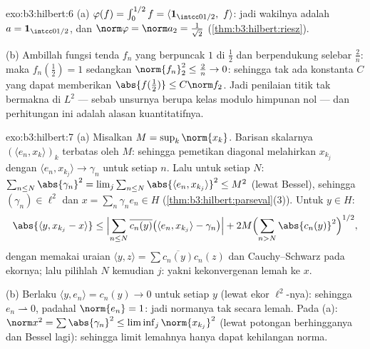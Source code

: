 \begin{solution}{exo:b3:hilbert:6}
(a) $\varphi(f) = \int_0^{1/2}f = \langle\mathbf
1_{\intcc0{1/2}},\ f\rangle$: jadi wakilnya adalah $a =
\mathbf 1_{\intcc0{1/2}}$, dan $\norm\varphi = \norm a_2 =
\frac1{\sqrt2}$ (\cref{thm:b3:hilbert:riesz}).

(b) Ambillah fungsi tenda $f_n$ yang berpuncak $1$ di
$\frac12$ dan berpendukung selebar $\frac2n$: maka $f_n(\tfrac12) = 1$
sedangkan $\norm{f_n}_2^2 \leq \frac2n \to 0$: sehingga tak ada konstanta $C$
yang dapat memberikan $\abs{f(\frac12)} \leq C\norm f_2$. Jadi penilaian titik
tak bermakna di $L^2$ --- sebab unsurnya berupa kelas modulo himpunan
nol --- dan perhitungan ini adalah alasan kuantitatifnya.
\end{solution}

\begin{solution}{exo:b3:hilbert:7}
(a) Misalkan $M = \sup_k\norm{x_k}$. Barisan skalarnya
$(\langle e_n, x_k\rangle)_k$ terbatas oleh $M$: sehingga pemetikan
diagonal melahirkan $x_{k_j}$ dengan $\langle e_n, x_{k_j}\rangle
\to \gamma_n$ untuk setiap $n$. Lalu untuk setiap $N$: $\sum_{n\leq
N}\abs{\gamma_n}^2 = \lim_j\sum_{n\leq N}\abs{\langle e_n,
x_{k_j}\rangle}^2 \leq M^2$ (lewat Bessel), sehingga $(\gamma_n) \in
\ell^2$ dan $x = \sum_n\gamma_ne_n \in H$
(\cref{thm:b3:hilbert:parseval}(3)). Untuk $y \in H$:
\[
\abs{\langle y, x_{k_j} - x\rangle}
\leq \Bigl|\sum_{n\leq N}\overline{c_n(y)}\bigl(\langle e_n,
x_{k_j}\rangle - \gamma_n\bigr)\Bigr|
+ 2M\Bigl(\sum_{n>N}\abs{c_n(y)}^2\Bigr)^{1/2},
\]
dengan memakai uraian $\langle y, z\rangle =
\sum\overline{c_n(y)}c_n(z)$ dan Cauchy--Schwarz pada ekornya;
lalu pilihlah $N$ kemudian $j$: yakni kekonvergenan lemah ke $x$.

(b) Berlaku $\langle y, e_n\rangle = c_n(y) \to 0$ untuk setiap $y$
(lewat ekor $\ell^2$-nya): sehingga $e_n \rightharpoonup 0$, padahal $\norm{e_n} =
1$: jadi normanya tak  secara lemah. Pada (a): $\norm x^2 =
\sum\abs{\gamma_n}^2 \leq \liminf_j\norm{x_{k_j}}^2$ (lewat potongan
berhingganya dan Bessel lagi): sehingga limit lemahnya hanya dapat kehilangan norma.
\end{solution}

